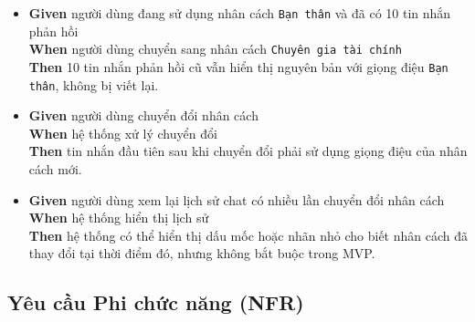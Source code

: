 \begin{itemize}
\item \textbf{Given} người dùng đang sử dụng nhân cách \texttt{Bạn thân} và đã có 10 tin nhắn phản hồi  \\ \hspace*{1.5em}  \textbf{When} người dùng chuyển sang nhân cách \texttt{Chuyên gia tài chính}  \\ \hspace*{1.5em}  \textbf{Then} 10 tin nhắn phản hồi cũ vẫn hiển thị nguyên bản với giọng điệu \texttt{Bạn thân}, không bị viết lại.
\item \textbf{Given} người dùng chuyển đổi nhân cách  \\ \hspace*{1.5em}  \textbf{When} hệ thống xử lý chuyển đổi  \\ \hspace*{1.5em}  \textbf{Then} tin nhắn đầu tiên sau khi chuyển đổi phải sử dụng giọng điệu của nhân cách mới.
\item \textbf{Given} người dùng xem lại lịch sử chat có nhiều lần chuyển đổi nhân cách  \\ \hspace*{1.5em}  \textbf{When} hệ thống hiển thị lịch sử  \\ \hspace*{1.5em}  \textbf{Then} hệ thống có thể hiển thị dấu mốc hoặc nhãn nhỏ cho biết nhân cách đã thay đổi tại thời điểm đó, nhưng không bắt buộc trong MVP.
\end{itemize}
\subsection{Yêu cầu Phi chức năng (NFR)}

